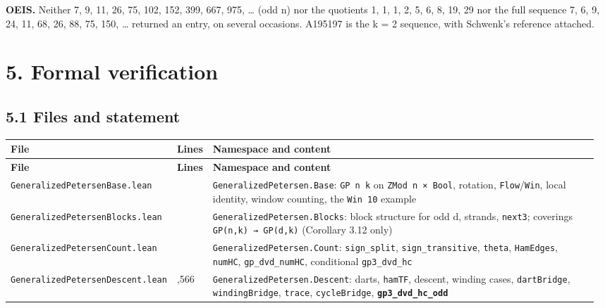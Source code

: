 \documentclass[11pt,a4paper]{article}
\theoremstyle{named}
\begin{document}
\textbf{OEIS.} Neither 7, 9, 11, 26, 75, 102, 152, 399, 667, 975, … (odd n) nor the quotients 1, 1, 1, 2, 5, 6, 8, 19, 29 nor the full sequence 7, 6, 9, 24, 11, 68, 26, 88, 75, 150, … returned an entry, on several occasions. A195197 is the k = 2 sequence, with Schwenk's reference attached.

\section*{5. Formal verification}

\subsection*{5.1 Files and statement}
\begin{small}
\begin{longtable}{>{\raggedright\arraybackslash}p{0.264\linewidth}>{\raggedright\arraybackslash}p{0.05\linewidth}>{\raggedright\arraybackslash}p{0.66\linewidth}}
\hline
\textbf{File} & \textbf{Lines} & \textbf{Namespace and content} \\
\hline
\endfirsthead
\hline
\textbf{File} & \textbf{Lines} & \textbf{Namespace and content} \\
\hline
\endhead
\hline
\endfoot
\texttt{GeneralizedPetersenBase.\allowbreak{}lean} & 697 & \texttt{GeneralizedPetersen.\allowbreak{}Base}: \texttt{GP\ \allowbreak{}n\ \allowbreak{}k} on \texttt{ZMod\ \allowbreak{}n\ \allowbreak{}×\ \allowbreak{}Bool}, rotation, \texttt{Flow}/\texttt{Win}, local identity, window counting, the \texttt{Win\ \allowbreak{}10} example \\
\texttt{GeneralizedPetersenBlocks.\allowbreak{}lean} & 874 & \texttt{GeneralizedPetersen.\allowbreak{}Blocks}: block structure for odd d, strands, \texttt{next3}; coverings \texttt{GP(n,k)\ \allowbreak{}→\ \allowbreak{}GP(d,k)} (Corollary 3.12 only) \\
\texttt{GeneralizedPetersenCount.\allowbreak{}lean} & 681 & \texttt{GeneralizedPetersen.\allowbreak{}Count}: \texttt{sign\_\allowbreak{}split}, \texttt{sign\_\allowbreak{}transitive}, \texttt{theta}, \texttt{HamEdges}, \texttt{numHC}, \texttt{gp\_\allowbreak{}dvd\_\allowbreak{}numHC}, conditional \texttt{gp3\_\allowbreak{}dvd\_\allowbreak{}hc} \\
\texttt{GeneralizedPetersenDescent.\allowbreak{}lean} & 2,566 & \texttt{GeneralizedPetersen.\allowbreak{}Descent}: darts, \texttt{hamTF}, descent, winding cases, \texttt{dartBridge}, \texttt{windingBridge}, \texttt{trace}, \texttt{cycleBridge}, \textbf{\texttt{gp3\_\allowbreak{}dvd\_\allowbreak{}hc\_\allowbreak{}odd}} \\

\end{longtable}
\end{small}
\end{document}
